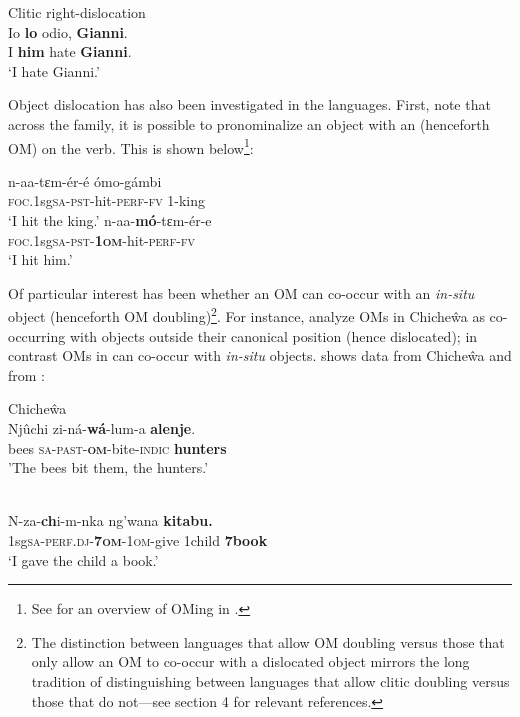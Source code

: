 \documentclass[output=paper
,newtxmath
,modfonts
,nonflat]{langsci/langscibook}
\begin{document}
\ex\label{ex:ranero:2b} Clitic right-dislocation\\
\gll Io \textbf{lo}    odio, \textbf{Gianni}. \\
I   \textbf{him} hate  \textbf{Gianni}.\\
\glt ‘I hate Gianni.’ 
\z
\z

Object dislocation has also been investigated in the  languages. First, note that across the family, it is possible to pronominalize an object with an  (henceforth OM) on the verb. This is shown below\footnote{See \citet{Marlo2015} for an overview of OMing in .}:

\ea\label{ex:ranero:3}
 \citep{diercks2015}
\ea\label{ex:ranero:3a}
\gll n-aa-tɛm-ér-é       ómo-gámbi\\
\textsc{foc}.1sg\textsc{sa}{}-\textsc{pst}{}-hit-\textsc{perf-fv} 1-king  \\
\glt ‘I hit the king.’
\ex\label{ex:ranero:3b}
\gll n-aa-\textbf{mó}{}-tɛm-ér-e \\
\textsc{foc}.1sg\textsc{sa}{}-\textsc{pst}{}-\textbf{1\textsc{om}}{}-hit-\textsc{perf-fv}\\
\glt ‘I hit him.’
\z
\z

Of particular interest has been whether an OM can co-occur with an \textit{in-situ} object (henceforth OM doubling)\footnote{The distinction between  languages that allow OM doubling versus those that only allow an OM to co-occur with a dislocated object mirrors the long tradition of distinguishing between languages that allow clitic doubling versus those that do not—see section 4 for relevant references.}. For instance, \citet{Bresnan1987} analyze OMs in Chiche\^wa as co-occurring with objects outside their canonical position (hence dislocated); in contrast OMs in  can co-occur with \textit{in-situ} objects.  shows data from Chiche\^wa and  from :

\ea\label{ex:ranero:4}
Chiche\^wa \citep{Bresnan1987}\\
\gll Njûchi zi-ná-\textbf{wá}{}-lum-a            \textbf{alenje}.\\
bees     \textsc{sa-past-}\textbf{\textsc{om}}{}-bite-\textsc{indic} \textbf{hunters}\\
\glt 'The bees bit them, the hunters.’
\z

\ea\label{ex:ranero:5}
 \citep{Riedel2009}\\
\gll N-za-\textbf{ch}i-m{}-nka             ng’wana \textbf{kitabu.}   \\
1sg\textsc{sa-perf.dj}{}-\textbf{\textsc{7om}}\textsc{{}-}\textsc{1om}{}-give 1child     \textbf{7book}\\
\glt ‘I gave the child a book.’
\z
\end{document}

